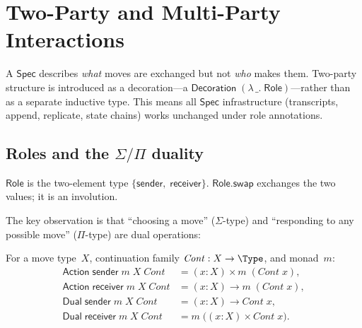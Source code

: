 
\section{Two-Party and Multi-Party Interactions}\label{sec:interaction-two-party}

A $\mathsf{Spec}$ describes \emph{what} moves are exchanged but not \emph{who}
makes them.  Two-party structure is introduced as a decoration---a
$\mathsf{Decoration}\;(\lambda\,\_.\;\mathsf{Role})$---rather than as a
separate inductive type.  This means all $\mathsf{Spec}$ infrastructure
(transcripts, append, replicate, state chains) works unchanged under role
annotations.

\subsection{Roles and the \texorpdfstring{$\Sigma/\Pi$}{Sigma/Pi} duality}

\begin{definition}[Role]
  \label{int:role}
  $\mathsf{Role}$ is the two-element type $\{\mathsf{sender},\;
  \mathsf{receiver}\}$.  $\mathsf{Role.swap}$ exchanges the two values;
  it is an involution.
\end{definition}

The key observation is that ``choosing a move'' ($\Sigma$-type) and ``responding
to any possible move'' ($\Pi$-type) are dual operations:

\begin{definition}
  \label{int:role-action-dual}
  For a move type~$X$, continuation family $\mathit{Cont} : X \to \Type$, and
  monad~$m$:
  \begin{align*}
    \mathsf{Action}\;\mathsf{sender}\;m\;X\;\mathit{Cont}
      &= (x : X) \times m\;(\mathit{Cont}\;x), \\
    \mathsf{Action}\;\mathsf{receiver}\;m\;X\;\mathit{Cont}
      &= (x : X) \to m\;(\mathit{Cont}\;x), \\[4pt]
    \mathsf{Dual}\;\mathsf{sender}\;m\;X\;\mathit{Cont}
      &= (x : X) \to \mathit{Cont}\;x, \\
    \mathsf{Dual}\;\mathsf{receiver}\;m\;X\;\mathit{Cont}
      &= m\;\bigl((x : X) \times \mathit{Cont}\;x\bigr).
  \end{align*}
\end{definition}


